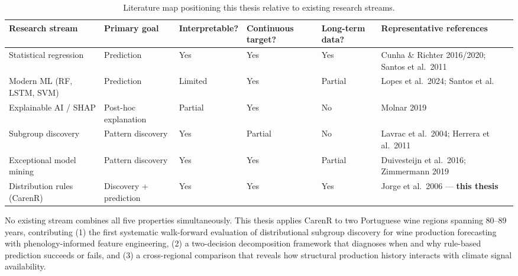 \begin{table}[htbp]
  \centering
  \caption{Literature map positioning this thesis relative to existing research streams.}\label{tab:ch2a_1}
  \small
  \renewcommand{\arraystretch}{1.1}
  \begin{adjustbox}{max width=\textwidth}
  \begin{tabularx}{\textwidth}{>{\raggedright}p{2.6cm} >{\raggedright}p{2.1cm} >{\centering}p{2cm} >{\centering}p{1.9cm} >{\centering}p{1.7cm} X}
    \toprule
    \textbf{Research stream} & \textbf{Primary goal} & \textbf{Interpretable?} & \textbf{Continuous target?} & \textbf{Long-term data?} & \textbf{Representative references} \\
    \midrule
    Statistical regression  & Prediction              & Yes     & Yes     & Yes     & Cunha \& Richter 2016/2020; Santos et al.\ 2011 \\
    Modern ML (RF, LSTM, SVM) & Prediction            & Limited & Yes     & Partial & Lopes et al.\ 2024; Santos et al. \\
    Explainable AI / SHAP   & Post-hoc explanation    & Partial & Yes     & No      & Molnar 2019 \\
    Subgroup discovery      & Pattern discovery       & Yes     & Partial & No      & Lavrac et al.\ 2004; Herrera et al.\ 2011 \\
    Exceptional model mining & Pattern discovery      & Yes     & Yes     & Partial & Duivesteijn et al.\ 2016; Zimmermann 2019 \\
    Distribution rules (CarenR) & Discovery + prediction & Yes & Yes     & Yes     & Jorge et al.\ 2006 --- \textbf{this thesis} \\
    \bottomrule
  \end{tabularx}
  \end{adjustbox}

\end{table}


No existing stream combines all five properties simultaneously. This thesis applies CarenR to two Portuguese wine regions spanning 80--89 years, contributing (1) the first systematic walk-forward evaluation of distributional subgroup discovery for wine production forecasting with phenology-informed feature engineering, (2) a two-decision decomposition framework that diagnoses when and why rule-based prediction succeeds or fails, and (3) a cross-regional comparison that reveals how structural production history interacts with climate signal availability.




